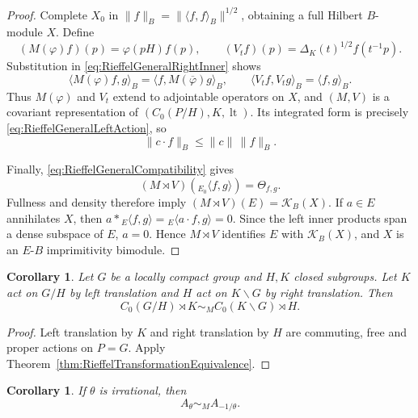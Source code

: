 \documentclass{book}
\newtheorem{corollary}[definition]{Corollary}
\begin{document}
\begin{proof}
  Complete \(X_0\) in
  \(\|f\|_B=\|\langle f,f\rangle_B\|^{1/2}\), obtaining a full Hilbert
  \(B\)-module \(X\).  Define
  \[
    (M(\varphi)f)(p)=\varphi(pH)f(p),
    \qquad
    (V_tf)(p)=\Delta_K(t)^{1/2}f(t^{-1}p).
  \]
  Substitution in \eqref{eq:RieffelGeneralRightInner} shows
  \[
    \langle M(\varphi)f,g\rangle_B
      =\langle f,M(\overline\varphi)g\rangle_B,
    \qquad
    \langle V_tf,V_tg\rangle_B=\langle f,g\rangle_B.
  \]
  Thus \(M(\varphi)\) and \(V_t\) extend to adjointable operators on \(X\),
  and \((M,V)\) is a covariant representation of
  \((C_0(P/H),K,\operatorname{lt})\).  Its integrated form is precisely
  \eqref{eq:RieffelGeneralLeftAction}, so
  \[
    \|c\cdot f\|_B\leq\|c\|\,\|f\|_B.
  \]

  Finally, \eqref{eq:RieffelGeneralCompatibility} gives
  \[
    (M\rtimes V)({}_{E_0}\!\langle f,g\rangle)=\Theta_{f,g}.
  \]
  Fullness and density therefore imply
  \((M\rtimes V)(E)=\mathcal K_B(X)\).  If \(a\in E\) annihilates \(X\),
  then
  \(a*{}_{E}\!\langle f,g\rangle={}_{E}\!\langle a\cdot f,g\rangle=0\).
  Since the left inner products span a dense subspace of \(E\), \(a=0\).
  Hence \(M\rtimes V\) identifies \(E\) with \(\mathcal K_B(X)\), and
  \(X\) is an \(E\)-\(B\) imprimitivity bimodule.
\end{proof}

\begin{corollary}\label{cor:RieffelClosedSubgroups}
  Let \(G\) be a locally compact group and \(H,K\) closed subgroups.  Let
  \(K\) act on \(G/H\) by left translation and \(H\) act on
  \(K\backslash G\) by right translation. Then
  \[
    C_0(G/H)\rtimes K
      \sim_M
    C_0(K\backslash G)\rtimes H.
  \]
\end{corollary}

\begin{proof}
  Left translation by \(K\) and right translation by \(H\) are commuting,
  free and proper actions on \(P=G\).  Apply
  Theorem~\ref{thm:RieffelTransformationEquivalence}.
\end{proof}

\begin{corollary}\label{cor:RieffelBasicEquivalence}
  If \(\theta\) is irrational, then
  \[
    A_\theta\sim_M A_{-1/\theta}.
  \]
\end{corollary}
\end{document}
